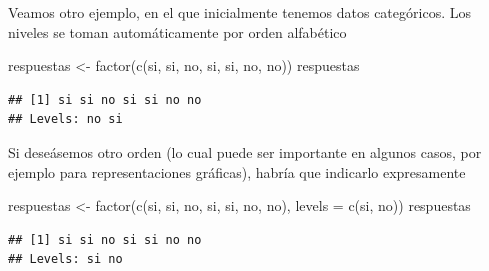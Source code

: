 \documentclass[
]{book}
\newenvironment{Shaded}{\begin{snugshade}}{\end{snugshade}}
\newcommand{\AttributeTok}[1]{\textcolor[rgb]{0.77,0.63,0.00}{#1}}
\newcommand{\FunctionTok}[1]{\textcolor[rgb]{0.00,0.00,0.00}{#1}}
\newcommand{\NormalTok}[1]{#1}
\newcommand{\OtherTok}[1]{\textcolor[rgb]{0.56,0.35,0.01}{#1}}
\newcommand{\StringTok}[1]{\textcolor[rgb]{0.31,0.60,0.02}{#1}}
\theoremstyle{break}
\theoremstyle{nonumberplain}
\begin{document}
Veamos otro ejemplo, en el que inicialmente tenemos datos categóricos.
Los niveles se toman automáticamente por orden alfabético

\begin{Shaded}
\begin{Highlighting}[]
\NormalTok{respuestas }\OtherTok{\textless{}{-}} \FunctionTok{factor}\NormalTok{(}\FunctionTok{c}\NormalTok{(}\StringTok{\textquotesingle{}si\textquotesingle{}}\NormalTok{, }\StringTok{\textquotesingle{}si\textquotesingle{}}\NormalTok{, }\StringTok{\textquotesingle{}no\textquotesingle{}}\NormalTok{, }\StringTok{\textquotesingle{}si\textquotesingle{}}\NormalTok{, }\StringTok{\textquotesingle{}si\textquotesingle{}}\NormalTok{, }\StringTok{\textquotesingle{}no\textquotesingle{}}\NormalTok{, }\StringTok{\textquotesingle{}no\textquotesingle{}}\NormalTok{))}
\NormalTok{respuestas}
\end{Highlighting}
\end{Shaded}

\begin{verbatim}
## [1] si si no si si no no
## Levels: no si
\end{verbatim}

Si deseásemos otro orden (lo cual puede ser importante en algunos casos, por ejemplo para representaciones gráficas), habría que indicarlo expresamente

\begin{Shaded}
\begin{Highlighting}[]
\NormalTok{respuestas }\OtherTok{\textless{}{-}} \FunctionTok{factor}\NormalTok{(}\FunctionTok{c}\NormalTok{(}\StringTok{\textquotesingle{}si\textquotesingle{}}\NormalTok{, }\StringTok{\textquotesingle{}si\textquotesingle{}}\NormalTok{, }\StringTok{\textquotesingle{}no\textquotesingle{}}\NormalTok{, }\StringTok{\textquotesingle{}si\textquotesingle{}}\NormalTok{, }\StringTok{\textquotesingle{}si\textquotesingle{}}\NormalTok{, }\StringTok{\textquotesingle{}no\textquotesingle{}}\NormalTok{, }\StringTok{\textquotesingle{}no\textquotesingle{}}\NormalTok{), }\AttributeTok{levels =} \FunctionTok{c}\NormalTok{(}\StringTok{\textquotesingle{}si\textquotesingle{}}\NormalTok{, }\StringTok{\textquotesingle{}no\textquotesingle{}}\NormalTok{))}
\NormalTok{respuestas}
\end{Highlighting}
\end{Shaded}

\begin{verbatim}
## [1] si si no si si no no
## Levels: si no
\end{verbatim}
\end{document}
